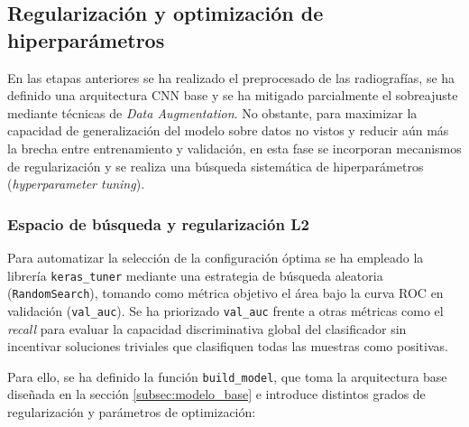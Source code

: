 \documentclass[11pt, a4paper]{article}
\numberwithin{equation}{section}
\begin{document}
\newpage

\subsection{Regularización y optimización de hiperparámetros}
En las etapas anteriores se ha realizado el preprocesado de las radiografías, se ha definido una arquitectura CNN base y se ha mitigado parcialmente el sobreajuste mediante técnicas de \textit{Data Augmentation}. No obstante, para maximizar la capacidad de generalización del modelo sobre datos no vistos y reducir aún más la brecha entre entrenamiento y validación, en esta fase se incorporan mecanismos de regularización y se realiza una búsqueda sistemática de hiperparámetros (\textit{hyperparameter tuning}).

\subsubsection{Espacio de búsqueda y regularización L2}
Para automatizar la selección de la configuración óptima se ha empleado la librería \texttt{keras\_tuner} mediante una estrategia de búsqueda aleatoria (\texttt{RandomSearch}), tomando como métrica objetivo el área bajo la curva ROC en validación (\texttt{val\_auc}). Se ha priorizado \texttt{val\_auc} frente a otras métricas como el \textit{recall} para evaluar la capacidad discriminativa global del clasificador sin incentivar soluciones triviales que clasifiquen todas las muestras como positivas.

Para ello, se ha definido la función \texttt{build\_model}, que toma la arquitectura base diseñada en la sección \ref{subsec:modelo_base} e introduce distintos grados de regularización y parámetros de optimización:
\end{document}
